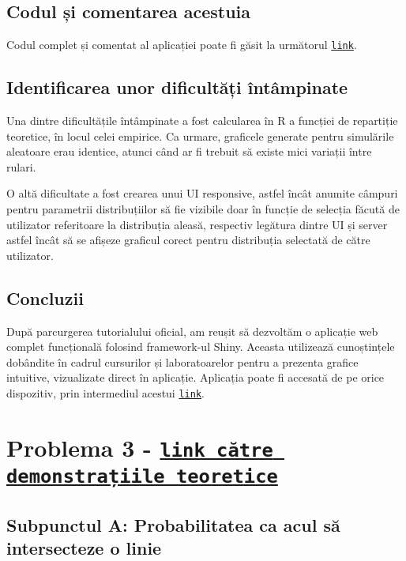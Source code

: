 \documentclass{article}
\begin{document}
\subsection*{Codul și comentarea acestuia}
\vspace{0.4em}
Codul complet și comentat al aplicației poate fi găsit la următorul \href{https://github.com/andreiOpran/Prob-and-Stat/blob/main/EX-2/app.R}{\texttt{link}}.

\subsection*{Identificarea unor dificultăți întâmpinate}
\vspace{0.4em}
Una dintre dificultățile întâmpinate a fost calcularea în R a funcției de repartiție teoretice, în locul celei empirice. Ca urmare, graficele generate pentru simulările aleatoare erau identice, atunci când ar fi trebuit să existe mici variații între rulari.

O altă dificultate a fost crearea unui UI responsive, astfel încât anumite câmpuri pentru parametrii distribuțiilor să fie vizibile doar în funcție de selecția făcută de utilizator referitoare la distribuția aleasă, respectiv legătura dintre UI și server astfel încât să se afișeze graficul corect pentru distribuția selectată de către utilizator.

\subsection*{Concluzii}
\vspace{0.4em}
După parcurgerea tutorialului oficial, am reușit să dezvoltăm o aplicație web complet funcțională folosind framework-ul Shiny. Aceasta utilizează cunoștințele dobândite în cadrul cursurilor și laboratoarelor pentru a prezenta grafice intuitive, vizualizate direct în aplicație. Aplicația poate fi accesată de pe orice dispozitiv, prin intermediul acestui \href{https://broski-corp.shinyapps.io/Exercitiul-2-PS/}{\texttt{link}}.

\newpage

\section{Problema 3 - \href{https://github.com/andreiOpran/Prob-and-Stat/tree/main/EX-3}{\texttt{link către demonstrațiile teoretice}}}

\subsection{Subpunctul A: Probabilitatea ca acul să intersecteze o linie}
\end{document}
